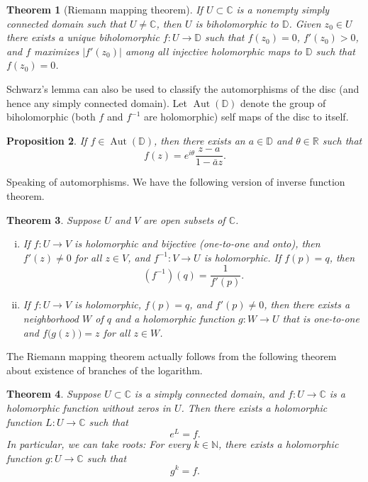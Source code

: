 \documentclass[12pt,openany]{book}
\newcommand{\Aut}{\operatorname{Aut}}
\newcommand{\sabs}[1]{\lvert {#1} \rvert}
\newcommand{\C}{{\mathbb{C}}}
\newcommand{\R}{{\mathbb{R}}}
\newcommand{\N}{{\mathbb{N}}}
\newcommand{\D}{{\mathbb{D}}}
\theoremstyle{plain}
\newtheorem{thm}{Theorem}[section]
\newtheorem{prop}[thm]{Proposition}
\theoremstyle{remark}
\theoremstyle{definition}
\theoremstyle{exercise}
\theoremstyle{example}
\begin{document}
\begin{thm}[Riemann mapping theorem]
If $U \subset \C$ is a nonempty simply connected domain such that $U \neq \C$,
then $U$ is biholomorphic to $\D$.  Given $z_0 \in U$
there exists a unique biholomorphic $f \colon U \to \D$
such that $f(z_0) = 0$, $f'(z_0) > 0$, and $f$
maximizes $\sabs{f'(z_0)}$ among all injective holomorphic maps to $\D$ such
that $f(z_0) = 0$.
\end{thm}

Schwarz's lemma can also be used to classify the automorphisms of the disc
(and hence any simply connected domain).  Let
$\Aut(\D)$ denote the group of biholomorphic (both $f$ and
$f^{-1}$ are holomorphic) self maps of the
disc to itself.

\begin{prop}
If $f \in \Aut(\D)$, then there exists an $a \in \D$
and $\theta \in \R$ such that
\begin{equation*}
f(z) = e^{i\theta} \frac{z-a}{1-\bar{a}z} .
\end{equation*}
\end{prop}

Speaking of automorphisms.  We have the following
version of inverse function theorem.

\begin{thm}
Suppose $U$ and $V$ are open subsets of $\C$.
\begin{enumerate}[(i)]
\item
If $f \colon U \to V$ is holomorphic and bijective (one-to-one and onto),
then $f'(z) \not= 0$ for all $z \in V$, and $f^{-1} \colon V \to U$
is holomorphic.  If $f(p) = q$, then
\begin{equation*}
\left(f^{-1}\right)(q) = \frac{1}{f'(p)} .
\end{equation*}
\item
If $f \colon U \to V$ is holomorphic, $f(p) = q$,
and $f'(p) \not= 0$, then there exists a neighborhood $W$ of $q$
and a holomorphic function $g \colon W \to U$ that is
one-to-one and $f\bigl(g(z)\bigr) = z$ for all $z \in W$.
\end{enumerate}
\end{thm}

\pagebreak[2]
The Riemann mapping theorem actually follows from the following
theorem about existence of branches of the logarithm.

\begin{thm}
Suppose $U \subset \C$ is a simply connected domain, and $f \colon U \to \C$
is a holomorphic function without zeros in $U$.  Then there exists a
holomorphic function $L \colon U \to \C$ such that
\begin{equation*}
e^L = f .
\end{equation*}
In particular, we can take roots:
For every $k \in \N$, there exists a holomorphic function
$g \colon U \to \C$ such that
\begin{equation*}
g^k = f .
\end{equation*}
\end{thm}
\end{document}
